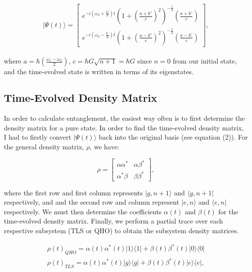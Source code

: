 \documentclass[12pt,a4paper]{article}
\begin{document}
\begin{equation}
    |\Psi(t)\rangle = \begin{bmatrix}
        e^{-i(\omega_2 + \frac{k'}{\hbar})t}(1+(\frac{a+k'}{c})^2)^{-\frac{1}{2}}(\frac{a+k'}{c}) \\
        e^{-i(\omega_2 - \frac{k'}{\hbar})t}(1+(\frac{a-k'}{c})^2)^{-\frac{1}{2}}(\frac{a-k'}{c})
    \end{bmatrix},
\end{equation}
\\
where $a = \hbar(\frac{\omega_1 - \omega_2}{2})$, $c = \hbar G\sqrt{n+1} = \hbar G$ since $n=0$ from our initial state, and the time-evolved state is written in terms of its eigenstates.
\\
\subsection{\normalsize{Time-Evolved Density Matrix}}

In order to calculate entanglement, the easiest way often is to first determine the density matrix for a pure state. In order to find the time-evolved density matrix, I had to firstly convert $|\Psi(t)\rangle$ back into the original basis (see equation (2)). For the general density matrix, $\rho$, we have:

\begin{equation}
    \rho = \begin{bmatrix}
        \alpha\alpha^* & \alpha\beta^* \\
        \alpha^*\beta & \beta\beta^*
    \end{bmatrix},
\end{equation}

where the first row and first column represents $|g,n+1\rangle$ and $\langle g,n+1|$ respectively, and  and the second row and column represent $|e,n\rangle$ and $\langle e,n|$ respectively. We must then determine the coefficients $\alpha(t)$ and $\beta(t)$ for the time-evolved density matrix. Finally, we perform a partial trace over each respective subsystem (TLS or QHO) to obtain the subsystem density matrices.

\begin{align}
    \rho(t)_{QHO} = \alpha(t)\alpha^*(t)|1\rangle\langle1| + \beta(t)\beta^*(t)|0\rangle\langle0|
    \\
    \rho(t)_{TLS} = \alpha(t)\alpha^*(t)|g\rangle\langle g| + \beta(t)\beta^*(t)|e\rangle\langle e|,
\end{align}
\end{document}
